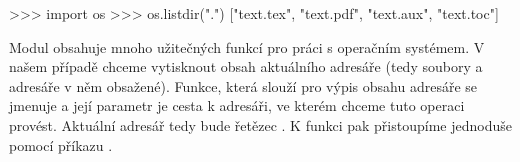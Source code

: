 \begin{python}
>>> import os
>>> os.listdir(".")
["text.tex", "text.pdf", "text.aux", "text.toc"]
\end{python}

Modul  obsahuje mnoho užitečných funkcí pro práci s operačním systémem. V našem případě chceme vytisknout obsah aktuálního adresáře (tedy soubory a adresáře v něm obsažené). Funkce, která slouží pro výpis obsahu adresáře se jmenuje  a její parametr je cesta k adresáři, ve kterém chceme tuto operaci provést. Aktuální adresář tedy bude řetězec . K funkci  pak přistoupíme jednoduše pomocí příkazu .


